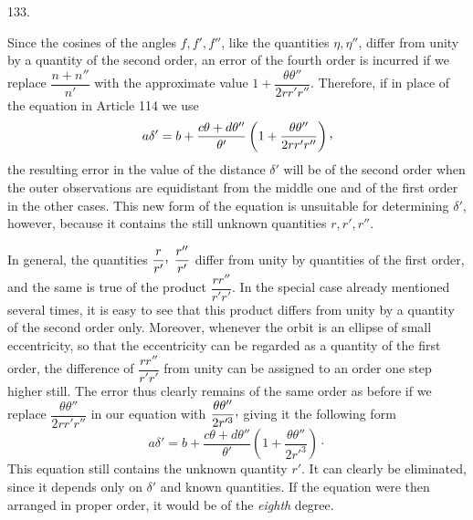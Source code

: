 \par{}\medskip
\begin{center}\hypertarget{native-179-article133}{}133.\end{center}
Since the cosines of the angles $f,f',f''$, like the quantities $\eta,\eta''$, differ from unity by a
quantity of the second order, an error of the fourth order is incurred if we replace $\dfrac{n+n''}{n'}$ with
the approximate value $1+\dfrac{\theta\theta''}{2rr'r''}$. Therefore, if in place of the equation in Article 114 we use
\[
a\delta'=b+\frac{c\theta+d\theta''}{\theta'}\left(1+\frac{\theta\theta''}{2rr'r''}\right)\mathpunct{\raisebox{.45ex}{,}}
\]
\hypertarget{native-180}{}the resulting error in the value of the distance $\delta'$ will be of the second order when the
outer observations are equidistant from the middle one and of the first order in the other
cases. This new form of the equation is unsuitable for determining $\delta'$, however, because it
contains the still unknown quantities $r,r',r''$.
\par
In general, the quantities $\dfrac{r}{r'}\mathpunct{\raisebox{.45ex}{,}}\;\dfrac{r''}{r'}$ differ from unity by quantities of the first order, and the
same is true of the product $\dfrac{rr''}{r'r'}$. In the special case already mentioned several times, it is
easy to see that this product differs from unity by a quantity of the second order only.
Moreover, whenever the orbit is an ellipse of small eccentricity, so that the eccentricity can
be regarded as a quantity of the first order, the difference of $\dfrac{rr''}{r'r'}$ from unity can be
assigned to an order one step higher still. The error thus clearly remains of the same order as
before if we replace $\dfrac{\theta\theta''}{2rr'r''}$ in our equation with $\dfrac{\theta\theta''}{2r'^3}\mathpunct{\raisebox{.45ex}{,}}$ giving it the following form
\[
a\delta'=b+\frac{c\theta+d\theta''}{\theta'}\left(1+\frac{\theta\theta''}{2r'^3}\right)\mathpunct{\cdot}
\]
This equation still contains the unknown quantity $r'$. It can clearly be eliminated, since it
depends only on $\delta'$ and known quantities. If the equation were then arranged in proper order,
it would be of the \textit{eighth} degree.
